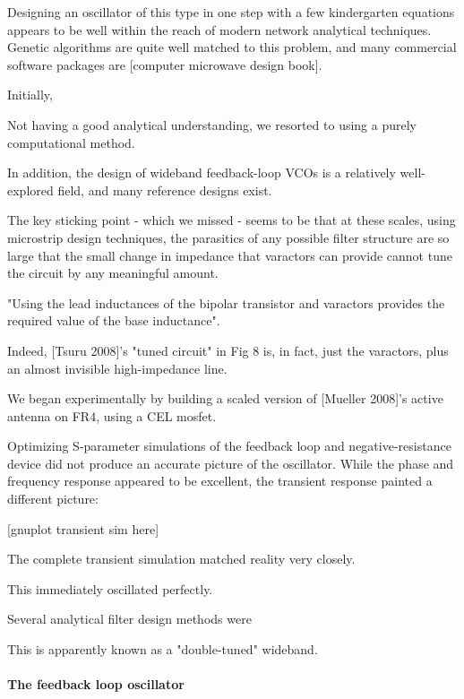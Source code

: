 \documentclass[fleqn,10pt]{article}
\begin{document}
\begin{multicols}{1}
Designing an oscillator of this type in one step with a few kindergarten equations appears to be well within the reach of modern network analytical techniques. Genetic algorithms are quite well matched to this problem, and many commercial software packages are  [computer microwave design book]. 

Initially, 

Not having a good analytical understanding, we resorted to using a purely computational method.

In addition, the design of wideband feedback-loop VCOs is a relatively well-explored field, and many reference designs exist. 

The key sticking point - which we missed - seems to be that at these scales, using microstrip design techniques, the parasitics of any possible filter structure are so large that the small change in impedance that varactors can provide cannot tune the circuit by any meaningful amount.

"Using the lead inductances of the bipolar transistor and varactors provides the required value of the base inductance".

Indeed, [Tsuru 2008]'s "tuned circuit" in Fig 8 is, in fact, just the varactors, plus an almost invisible high-impedance line.

We began experimentally by building a scaled version of [Mueller 2008]'s active antenna on FR4, using a CEL mosfet.



Optimizing S-parameter simulations of the feedback loop and negative-resistance device did not produce an accurate picture of the oscillator. While the phase and frequency response appeared to be excellent, the transient response painted a different picture:

[gnuplot transient sim here]

The complete transient simulation matched reality very closely. 


This immediately oscillated perfectly.





Several analytical filter design methods were 

This is apparently known as a "double-tuned" wideband.

%
\paragraph{\textbf{The feedback loop oscillator}}\


\end{multicols}
\end{document}
